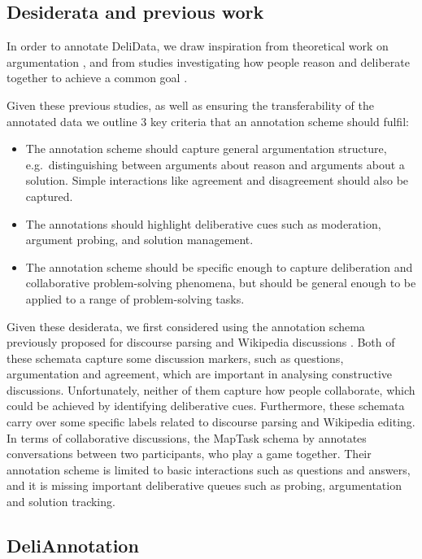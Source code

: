 \documentclass[acmsmall,manuscript,screen]{acmart}
\begin{document}
\subsection{Desiderata and previous work}


In order to annotate DeliData, we draw inspiration from theoretical work on argumentation \citep{walton_2005, toulmin_2003}, and from studies investigating how people reason and deliberate together to achieve a common goal \cite{mercier2011humans}.


Given these previous studies, as well as ensuring the transferability of the annotated data we outline 3 key criteria that an annotation scheme should fulfil: 
\begin{itemize}
    \item The annotation scheme should capture general argumentation structure, e.g.\ distinguishing between arguments about reason and arguments about a solution. Simple interactions like agreement and disagreement should also be captured.
    \item The annotations should highlight deliberative cues such as moderation, argument probing, and solution management. 
    \item The annotation scheme should be specific enough to capture deliberation and collaborative problem-solving phenomena, but should be general enough to be applied to a range of problem-solving tasks.
\end{itemize}



Given these desiderata, we first considered using the annotation schema previously proposed for discourse parsing \cite{coarse-discourse} and Wikipedia discussions \cite{al-khatib-etal-2018-modeling}. Both of these schemata capture some discussion markers, such as questions, argumentation and agreement, which are important in analysing constructive discussions. Unfortunately, neither of them capture
how people collaborate, which could be achieved by identifying deliberative cues. Furthermore, these schemata carry over some specific labels related to discourse parsing and Wikipedia editing. 
In terms of collaborative discussions, the MapTask schema by \citet{carletta1996hcrc} annotates conversations between two participants, who play a game together. Their annotation scheme is limited to basic interactions such as questions and answers,  and it is
missing important deliberative queues such as probing, argumentation and solution tracking.


\subsection{DeliAnnotation}
\end{document}
